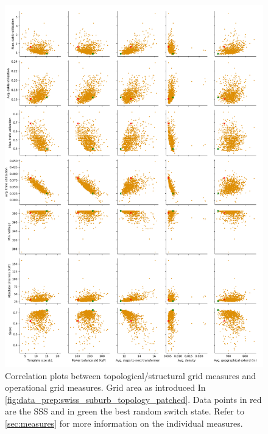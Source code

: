 \begin{figure}[H]
    \begin{center}
        \includegraphics[width=\linewidth]{img/switchstate_exploring/swiss_suburb/correleation.png}
    \end{center}
    \caption{
        Correlation plots between topological/structural grid measures and 
        operational grid measures. Grid area as introduced In
        \autoref{fig:data_prep:swiss_suburb_topology_patched}.
        Data points in red are the SSS and in green the best random switch state.
        Refer to \autoref{sec:measures} for more
        information on the individual measures.
    }
    \label{fig:correlation}
\end{figure}

